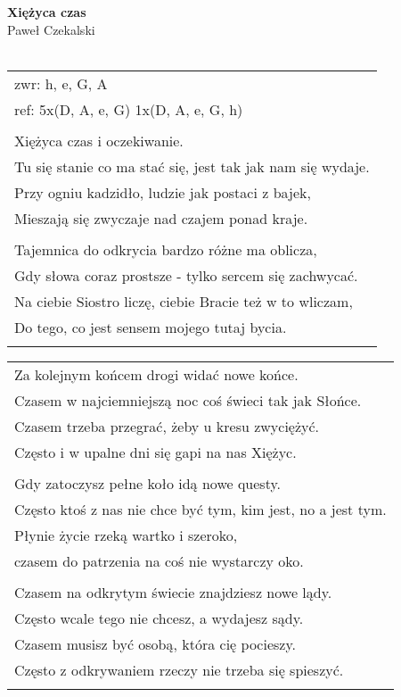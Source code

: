 \documentclass[a5paper]{article}
\begin{document}


\noindent
\fontsize{12pt}{15pt}\selectfont
\textbf{Xiężyca czas} \\
\fontsize{8pt}{10pt}\selectfont
Paweł Czekalski \\ \\
\fontsize{10pt}{12pt}\selectfont
{}
\begin{tabular}{@{}p{12cm}@{}}
\noindent
zwr: h, e, G, A \\
ref: 5x(D, A, e, G) 1x(D, A, e, G, h) \\ \\

Xiężyca czas i oczekiwanie. \\
Tu się stanie co ma stać się, jest tak jak nam się wydaje. \\
Przy ogniu kadzidło, ludzie jak postaci z bajek, \\
Mieszają się zwyczaje nad czajem ponad kraje. \\ \\

Tajemnica do odkrycia bardzo różne ma oblicza, \\
Gdy słowa coraz prostsze - tylko sercem się zachwycać. \\
Na ciebie Siostro liczę, ciebie Bracie też w to wliczam, \\
Do tego, co jest sensem mojego tutaj bycia. \\ \\
\end{tabular}

\noindent
\begin{tabular}{@{}p{12cm}@{}}
Za kolejnym końcem drogi widać nowe końce. \\
Czasem w najciemniejszą noc coś świeci tak jak Słońce. \\
Czasem trzeba przegrać, żeby u kresu zwyciężyć. \\
Często i w upalne dni się gapi na nas Xiężyc. \\ \\

Gdy zatoczysz pełne koło idą nowe questy. \\
Często ktoś z nas nie chce być tym, kim jest, no a jest tym. \\
Płynie życie rzeką wartko i szeroko, \\
czasem do patrzenia na coś nie wystarczy oko. \\ \\

Czasem na odkrytym świecie znajdziesz nowe lądy. \\
Często wcale tego nie chcesz, a wydajesz sądy. \\
Czasem musisz być osobą, która cię pocieszy. \\
Często z odkrywaniem rzeczy nie trzeba się spieszyć. \\ \\
\end{tabular}
\end{document}
